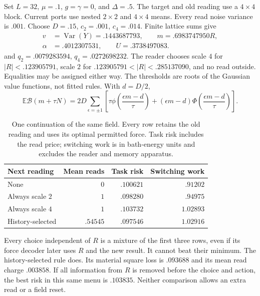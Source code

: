 \documentclass[12pt,a4paper]{article}
\newcommand{\E}{\mathbb E}
\newcommand{\Var}{\operatorname{Var}}
\begin{document}
Set $L=32$, $\mu=.1$, $g=\gamma=0$, and $\Delta=.5$. The target and
old reading use a $4\times4$ block. Current ports use nested
$2\times2$ and $4\times4$ means. Every read noise variance is $.001$.
Choose $D=.15$, $c_2=.001$, $c_4=.014$. Finite lattice sums give
\begin{align*}
 v&=\Var(Y)=.1443687793,\qquad m=.6983747950R,\\
 \alpha&=.4012307531,\qquad U=.3738497083.
\end{align*}
and $q_2=.0079283594$, $q_4=.0272698232$.
The reader chooses scale $4$ for $|R|<.123905791$, scale $2$ for
$.123905791<|R|<.285137090$, and no read outside. Equalities may be
assigned either way. The thresholds are roots of the Gaussian value
functions, not fitted rules. With $d=D/2$,
\begin{equation}\label{eq:normal-force-benefit}
 \E\mathcal B(m+\tau N)=2D\sum_{\epsilon=\pm1}
 \left[\tau\phi\!\left(\frac{\epsilon m-d}{\tau}\right)
 +(\epsilon m-d)\Phi\!\left(\frac{\epsilon m-d}{\tau}\right)\right].
\end{equation}

\begin{table}[ht]
\centering\small
\begin{tabular}{lrrr}
\toprule
Next reading & Mean reads & Task risk & Switching work\\
\midrule
None & $0$ & $.100621$ & $.91202$\\
Always scale $2$ & $1$ & $.098280$ & $.94975$\\
Always scale $4$ & $1$ & $.103732$ & $1.02893$\\
History-selected & $.54545$ & $.097546$ & $1.02916$\\
\bottomrule
\end{tabular}
\caption{One continuation of the same field. Every row retains the old
reading and uses its optimal permitted force. Task risk includes the
read price; switching work is in bath-energy units and excludes the
reader and memory apparatus.}\label{tab:field-control}
\end{table}

Every choice independent of $R$ is a mixture of the first three rows,
even if its force decoder later uses $R$ and the new result. It cannot
beat their minimum. The history-selected rule does. Its material
square loss is $.093688$ and its mean read charge $.003858$. If all
information from $R$ is removed before the choice and action, the
best risk in this same menu is $.103835$. Neither comparison allows
an extra read or a field reset.
\end{document}
